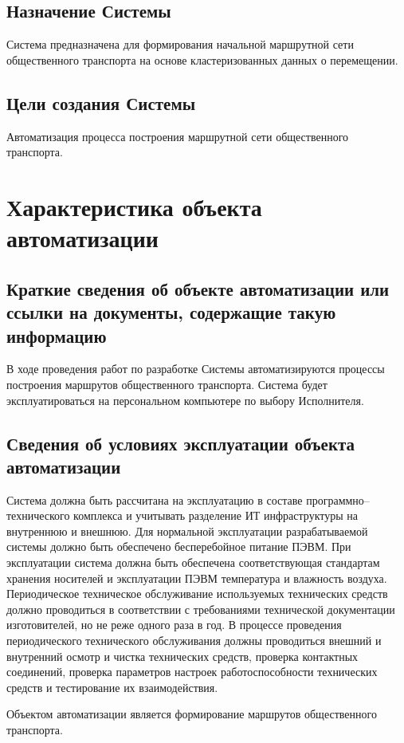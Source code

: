 \section{Назначение Системы}
Система предназначена для формирования начальной маршрутной сети общественного транспорта на основе 
кластеризованных данных о перемещении.

\section{Цели создания Системы}
Автоматизация процесса построения маршрутной сети общественного транспорта.

\vspace{3em}
\chapter{Характеристика объекта автоматизации}
\section{Краткие сведения об объекте автоматизации или ссылки на документы, содержащие такую информацию}
В ходе проведения работ по разработке Системы автоматизируются процессы построения маршрутов общественного 
транспорта. Система будет эксплуатироваться на персональном компьютере по выбору Исполнителя.

\section{Сведения об условиях эксплуатации объекта автоматизации}
Система должна быть рассчитана на эксплуатацию в составе программно– технического комплекса и учитывать 
разделение ИТ инфраструктуры на внутреннюю и внешнюю. Для нормальной эксплуатации разрабатываемой системы 
должно быть обеспечено бесперебойное питание ПЭВМ. При эксплуатации система должна быть обеспечена 
соответствующая стандартам хранения носителей и эксплуатации ПЭВМ температура и влажность воздуха. 
Периодическое техническое обслуживание используемых технических средств должно проводиться в соответствии 
с требованиями технической документации изготовителей, но не реже одного раза в год. В процессе проведения 
периодического технического обслуживания должны проводиться внешний и внутренний осмотр и чистка 
технических средств, проверка контактных соединений, проверка параметров настроек работоспособности 
технических средств и тестирование их взаимодействия.

Объектом автоматизации является формирование маршрутов общественного транспорта.

